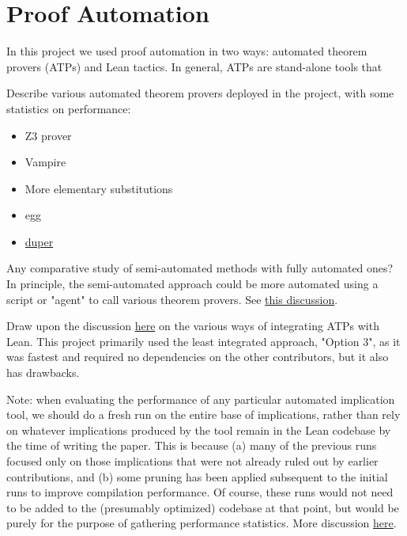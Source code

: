 \section{Proof Automation}\label{automated-sec}

In this project we used proof automation in two ways: automated theorem provers (ATPs) and Lean tactics. In general, ATPs are stand-alone tools that



Describe various automated theorem provers deployed in the project, with some statistics on performance:

\begin{itemize}
    \item Z3 prover
    \item Vampire
    \item More elementary substitutions
    \item egg
    \item \href{https://leanprover.zulipchat.com/#narrow/channel/458659-Equational/topic/Austin.20pairs/near/479643838}{duper}
\end{itemize}

Any comparative study of semi-automated methods with fully automated ones? In principle, the semi-automated approach could be more automated using a script or "agent" to call various theorem provers. See \href{https://leanprover.zulipchat.com/#narrow/stream/458659-Equational/topic/A.20magma.20of.20order.20.3C.2013.20-.20for.20Equation2531.3F}{this discussion}.

Draw upon the discussion \href{https://leanprover.zulipchat.com/#narrow/stream/458659-Equational/topic/Future.20of.20Using.20ATPs}{here} on the various ways of integrating ATPs with Lean. This project primarily used the least integrated approach, "Option 3", as it was fastest and required no dependencies on the other contributors, but it also has drawbacks.

Note: when evaluating the performance of any particular automated implication tool, we should do a fresh run on the entire base of implications, rather than rely on whatever implications produced by the tool remain in the Lean codebase by the time of writing the paper. This is because (a) many of the previous runs focused only on those implications that were not already ruled out by earlier contributions, and (b) some pruning has been applied subsequent to the initial runs to improve compilation performance. Of course, these runs would not need to be added to the (presumably optimized) codebase at that point, but would be purely for the purpose of gathering performance statistics. More discussion \href{https://leanprover.zulipchat.com/#narrow/stream/458659-Equational/topic/RECORDS.20REQUEST.3A.20data.20and.20performance.20automated.20run.20metrics}{here}.

